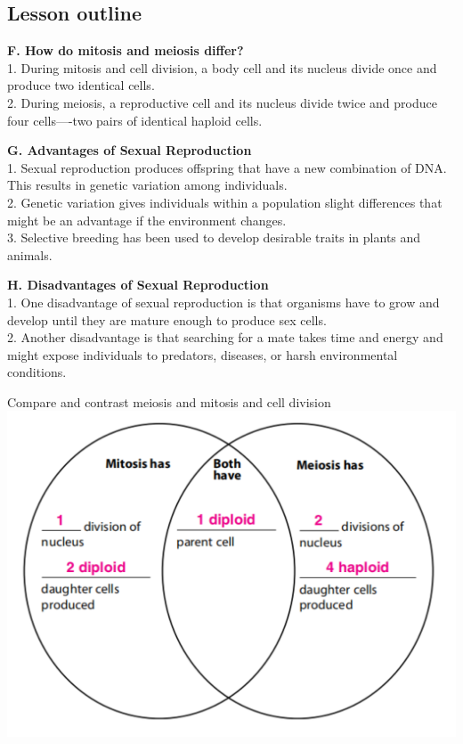 \documentclass[
]{book}
\begin{document}
\hypertarget{lesson-outline-3}{%
\subsection{Lesson outline}\label{lesson-outline-3}}

\textbf{F. How do mitosis and meiosis differ?}\\
1. During {mitosis} and cell division, a body cell and its nucleus divide once and produce two identical cells.\\
2. During {meiosis}, a reproductive cell and its nucleus divide twice and produce four cells----two pairs of identical haploid cells.

\textbf{G. Advantages of Sexual Reproduction}\\
1. Sexual reproduction produces {offspring} that have a new combination of DNA. This results in genetic {variation} among individuals.\\
2. Genetic variation gives individuals within a population slight differences that might be an advantage if the {environment} changes.\\
3. {Selective breeding} has been used to develop desirable traits in plants and animals.

\textbf{H. Disadvantages of Sexual Reproduction}\\
1. One disadvantage of sexual reproduction is that organisms have to grow and develop until they are mature enough to produce {sex} cells.\\
2. Another disadvantage is that searching for a mate takes time and energy and might expose individuals to predators, {diseases}, or harsh environmental conditions.

Compare and contrast meiosis and mitosis and cell division
\includegraphics{./img/mitosis-meiosis.png}
\end{document}
